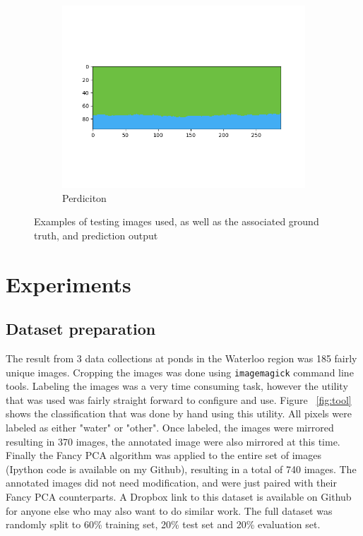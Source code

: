 \documentclass[10pt,twocolumn,letterpaper]{article}
\begin{document}
\begin{figure}[hpt]
\begin{center}
\begin{subfigure}{0.3\textwidth}
  		\includegraphics[width=\linewidth,trim={1.25cm 1.5cm 1.5cm 1.25cm},clip]{perdiction5.png}
  		\caption{Perdiciton}
  \end{subfigure}
  
  
 
\end{center}
   \caption{Examples of testing images used, as well as the associated ground truth, and prediction output}
\label{fig:prediction_results}
\end{figure}
\section{Experiments}

\subsection{Dataset preparation}
The result from 3 data collections at ponds in the Waterloo region was 185 fairly unique images. Cropping the images was done using \verb|imagemagick| command line tools. Labeling the images was a very time consuming task, however the utility that was used was fairly straight forward to configure and use. Figure ~\ref{fig:tool} shows the classification that was done by hand using this utility. All pixels were labeled as either "water" or "other". Once labeled, the images were mirrored resulting in 370 images, the annotated image were also mirrored at this time. Finally the Fancy PCA algorithm was applied to the entire set of images (Ipython code is available on my Github), resulting in a total of 740 images. The annotated images did not need modification, and were just paired with their Fancy PCA counterparts. A Dropbox link to this dataset is available on Github for anyone else who may also want to do similar work. The full dataset was randomly split to 60\% training set, 20\% test set and 20\% evaluation set.
\end{document}
